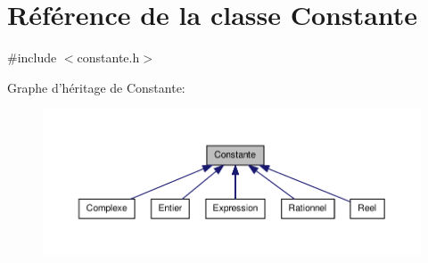 \hypertarget{class_constante}{\section{\-Référence de la classe \-Constante}
\label{class_constante}
}


{\ttfamily \#include $<$constante.\-h$>$}



\-Graphe d'héritage de \-Constante\-:\nopagebreak
\begin{figure}[H]
\begin{center}
\leavevmode
\includegraphics[width=350pt]{class_constante__inherit__graph}
\end{center}
\end{figure}
